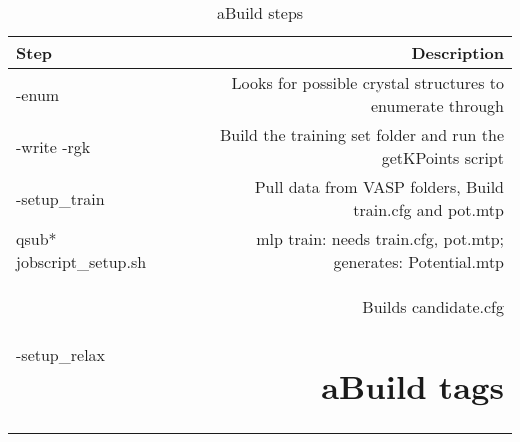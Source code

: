 \documentclass{article}
\begin{document}
\begin{table}
        \begin{center}
                \caption{aBuild steps}
                \label{bashcommands}
                \begin{tabular}{l|r}
                  \textbf{Step} & \textbf{Description}\\
                  \hline
                  -enum & Looks for possible crystal structures to
                          enumerate through\\
                  -write -rgk & Build the training set folder and run
                                the getKPoints script\\
                  -setup\_train & Pull data from VASP folders, Build
                                 train.cfg and pot.mtp\\
                  qsub* jobscript\_setup.sh & mlp train: needs
                                             train.cfg, pot.mtp;
                                              generates:
                                              Potential.mtp\\
                  -setup\_relax & Builds candidate.cfg




\section{aBuild tags} %



\end{tabular}
\end{center}
\end{table}
\end{document}
